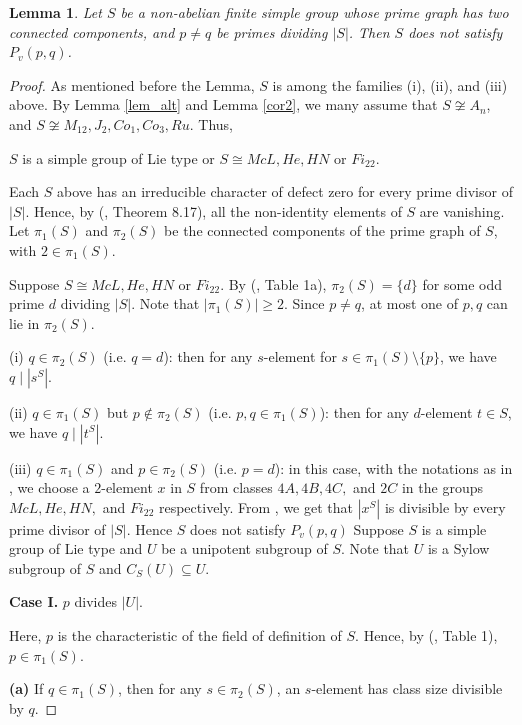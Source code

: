 \documentclass[11pt, a4paper]{article}
\numberwithin{equation}{section}
\theoremstyle{plain} %
\newtheorem{lemma}[theorem]{Lemma}
\begin{document}
\begin{lemma}\label{lemma2.4}
Let $S$ be a non-abelian finite simple group whose prime graph has two connected components, and $p\neq q$ be primes dividing $|S|$. Then $S$ does not satisfy $P_v(p,q)$. 
\end{lemma}
\begin{proof}
As mentioned before the Lemma, $S$ is among the families (i), (ii), and (iii) above. By Lemma \ref{lem_alt} and Lemma \ref{cor2}, we many assume that $S\not\cong A_n$, and $S\not\cong M_{12}, J_2, Co_1, Co_3, Ru$. Thus, 
\begin{center}
$S$ is a simple group of Lie type or $S\cong McL, He, HN$ or $Fi_{22}$. 
\end{center}
Each $S$ above has an irreducible character of defect zero for every prime divisor of $|S|$. Hence, by (\cite{MR1280461}, Theorem 8.17), all the non-identity elements of $S$ are vanishing. Let $\pi_1(S)$ and $\pi_2(S)$ be the connected components of the prime graph of $S$, with $2\in \pi_1(S)$. 



Suppose $S\cong McL, He, HN$ or $Fi_{22}$. By (\cite{MR1922988}, Table 1a), $\pi_2(S)=\{d\}$ for some odd prime $d$ dividing $|S|$. Note that $|\pi_1(S)|\ge 2$. Since $p\neq q$, at most one of $p,q$ can lie in $\pi_2(S)$. 


(i) $q\in\pi_2(S)$ (i.e. $q=d$): then for any $s$-element for $s\in\pi_1(S)\setminus \{p\}$, we have $q\mid |s^S|$.  

(ii) $q\in \pi_1(S)$ but $p\notin \pi_2(S)$ (i.e. $p,q\in \pi_1(S)$): then for any $d$-element $t\in S$, we have $q\mid|t^S|$.   

(iii) $q\in \pi_1(S)$ and $p\in\pi_2(S)$ (i.e. $p=d$): in this case, with the notations as in \cite{MR827219}, we choose a $2$-element $x$ in $S$ from classes  $4A, 4B, 4C,$ and $2C$ in the groups $McL, He, HN,$ and $Fi_{22}$ respectively. From \cite{MR827219}, we get that $|x^S|$ is divisible by every prime divisor of $|S|$. Hence $S$ does not satisfy $P_v(p,q)$
\vskip5mm
Suppose $S$ is a simple group of Lie type and $U$ be a unipotent subgroup of $S$. Note that $U$ is a Sylow subgroup of $S$ and $C_S(U)\subseteq U$.



\textbf{Case I.} $p$ divides $|U|$.

Here, $p$ is the characteristic of the field of definition of $S$. Hence, by (\cite{MR1922988}, Table 1), $p\in\pi_1(S)$.  

{\bf (a)} If $q\in\pi_1(S)$, then for any $s\in \pi_2(S)$, an $s$-element has class size divisible by $q$. 


\end{proof}
\end{document}
